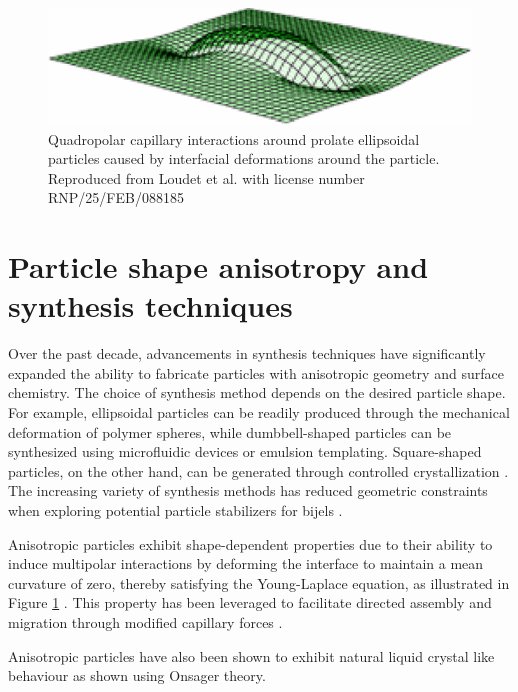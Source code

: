 \begin{figure}
    \centering
    \includegraphics[scale = 0.5]{figures/literature_review/interfacial_curvature.png}
    \caption{Quadropolar capillary interactions around prolate ellipsoidal particles caused by interfacial deformations around the particle. 
    \cite{loudet_capillary_2005} Reproduced from Loudet et al. with license number RNP/25/FEB/088185}
    \label{fig:anisotropic_particle_interface}
\end{figure}

\section{Particle shape anisotropy and synthesis techniques}

Over the past decade, advancements in synthesis techniques have significantly expanded the ability to fabricate particles with anisotropic geometry and surface chemistry. 
The choice of synthesis method depends on the desired particle shape. For example, ellipsoidal particles can be readily produced through the mechanical deformation of 
polymer spheres, while dumbbell-shaped particles can be synthesized using microfluidic devices or emulsion templating. Square-shaped particles, on the other hand, can be 
generated through controlled crystallization \cite{morgan_understanding_2013}. The increasing variety of synthesis methods has reduced geometric constraints when exploring 
potential particle stabilizers for bijels \cite{wu_recent_2016}.

Anisotropic particles exhibit shape-dependent properties due to their ability to induce multipolar interactions by deforming the interface to maintain a mean curvature of 
zero, thereby satisfying the Young-Laplace equation, as illustrated in Figure \ref{fig:anisotropic_particle_interface} \cite{loudet_capillary_2005, cheng_shape-anisotropic_2013}.
This property has been leveraged to facilitate directed assembly and migration through modified capillary forces 
\cite{cavallaro_curvature-driven_2011, read_dimerization_2020, sharifi-mood_curvature_2015}.  

Anisotropic particles have also been shown to exhibit natural liquid crystal like behaviour as shown using Onsager theory. 


